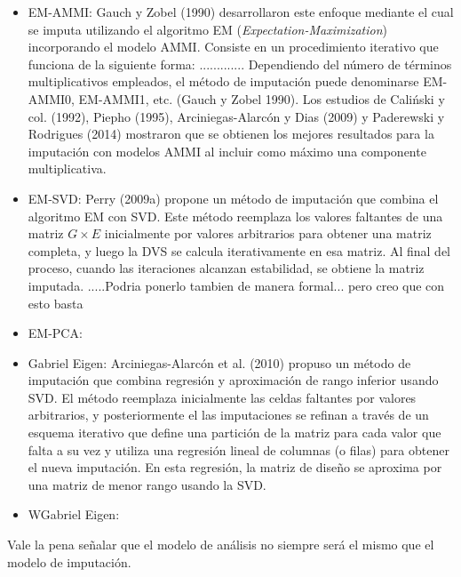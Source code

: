 \begin{itemize}
\item EM-AMMI: Gauch y Zobel (1990) desarrollaron este enfoque mediante el cual se imputa utilizando el algoritmo EM (\emph{Expectation-Maximization}) incorporando el modelo AMMI. Consiste en un procedimiento iterativo que funciona de la siguiente forma: .............
Dependiendo del número de términos multiplicativos empleados, el método de imputación puede denominarse EM-AMMI0, EM-AMMI1, etc. (Gauch y Zobel 1990). Los estudios de Caliński y col. (1992), Piepho (1995), Arciniegas-Alarcón y Dias (2009) y Paderewski y
Rodrigues (2014) mostraron que se obtienen los mejores resultados para la imputación con modelos AMMI al incluir como máximo una componente multiplicativa.
\end{itemize}
\begin{itemize}
\item EM-SVD: Perry (2009a) propone un método de imputación que combina el algoritmo EM con SVD. Este método reemplaza los valores faltantes de una matriz $G \times E$ inicialmente por valores arbitrarios para obtener una matriz completa, y luego la DVS se calcula iterativamente en esa matriz. Al final del proceso, cuando las iteraciones alcanzan estabilidad, se obtiene la matriz imputada.
.....Podria ponerlo tambien de manera formal... pero creo que con esto basta
\end{itemize}
\begin{itemize}
\item EM-PCA:
\end{itemize}
\begin{itemize}
\item Gabriel Eigen: Arciniegas-Alarcón et al. (2010) propuso un método de imputación que combina regresión y aproximación de rango inferior usando SVD. El método reemplaza inicialmente las celdas faltantes por valores arbitrarios, y posteriormente el
las imputaciones se refinan a través de un esquema iterativo que define una partición de la matriz para cada valor que falta a su vez y utiliza una regresión lineal de columnas (o filas) para obtener el nueva imputación. En esta regresión, la matriz de diseño se aproxima por una matriz de menor rango usando la SVD.
\end{itemize}
\begin{itemize}
\item WGabriel Eigen:
\end{itemize}

Vale la pena señalar que el modelo de análisis no siempre será el mismo que el modelo de imputación.





